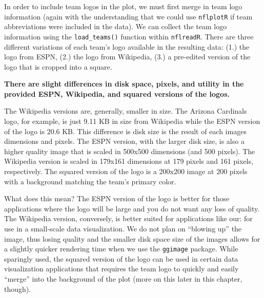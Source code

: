 \documentclass[
  letterpaper,
]{krantz}
\begin{document}
In order to include team logos in the plot, we must first merge in team
logo information (again with the understanding that we could use
\texttt{nflplotR} if team abbreviations were included in the data). We
can collect the team logo information using the \texttt{load\_teams()}
function within \texttt{nflreadR}. There are three different variations
of each team's logo available in the resulting data: (1.) the logo from
ESPN, (2.) the logo from Wikipedia, (3.) a pre-edited version of the
logo that is cropped into a square.

\begin{tcolorbox}[enhanced jigsaw, left=2mm, toprule=.15mm, opacitybacktitle=0.6, leftrule=.75mm, bottomrule=.15mm, colbacktitle=quarto-callout-note-color!10!white, breakable, colback=white, bottomtitle=1mm, toptitle=1mm, title=\textcolor{quarto-callout-note-color}{\faInfo}\hspace{0.5em}{Note}, coltitle=black, titlerule=0mm, arc=.35mm, opacityback=0, colframe=quarto-callout-note-color-frame, rightrule=.15mm]

\textbf{There are slight differences in disk space, pixels, and utility
in the provided ESPN, Wikipedia, and squared versions of the logos.}

The Wikipedia versions are, generally, smaller in size. The Arizona
Cardinals logo, for example, is just 9.11 KB in size from Wikipedia
while the ESPN version of the logo is 20.6 KB. This difference is disk
size is the result of each images dimensions and pixels. The ESPN
version, with the larger disk size, is also a higher quality image that
is scaled in 500x500 dimensions (and 500 pixels). The Wikipedia version
is scaled in 179x161 dimensions at 179 pixels and 161 pixels,
respectively. The squared version of the logo is a 200x200 image at 200
pixels with a background matching the team's primary color.

What does this mean? The ESPN version of the logo is better for those
applications where the logo will be large and you do not want any loss
of quality. The Wikipedia version, conversely, is better suited for
applications like our: for use in a small-scale data visualization. We
do not plan on ``blowing up'' the image, thus losing quality and the
smaller disk space size of the images allows for a slightly quicker
rendering time when we use the \texttt{ggimage} package. While sparingly
used, the squared version of the logo can be used in certain data
visualization applications that requires the team logo to quickly and
easily ``merge'' into the background of the plot (more on this later in
this chapter, though).

\end{tcolorbox}
\end{document}
